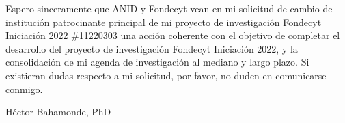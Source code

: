 \documentclass[9pt,stdletter,dateno,sigleft,openany]{newlfm} %
\begin{document}
\begin{newlfm}
Espero sinceramente que ANID y Fondecyt vean en mi solicitud de cambio de instituci\'on patrocinante principal de mi proyecto de investigaci\'on Fondecyt Iniciaci\'on 2022 \#11220303 una acci\'on coherente con el objetivo de completar el desarrollo del proyecto de investigaci\'on Fondecyt Iniciaci\'on 2022, y la consolidaci\'on de mi agenda de investigaci\'on al mediano y largo plazo. Si existieran dudas respecto a mi solicitud, por favor, no duden en comunicarse conmigo.

{\vspace{0.5cm}\hspace{10cm}H\'ector Bahamonde, PhD}


\end{newlfm}
\end{document}
